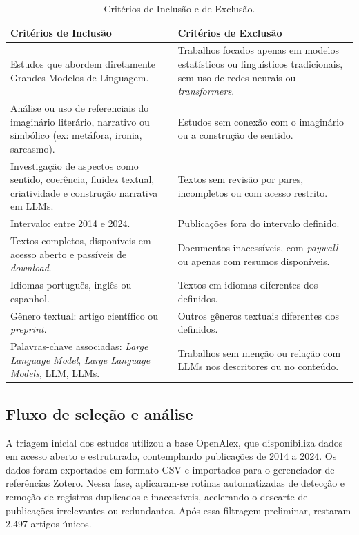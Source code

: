 \documentclass[portuguese]{textolivre}
\begin{document}
\begin{table}[h!]
\centering
\begin{threeparttable}
\caption{Critérios de Inclusão e de Exclusão.}\label{tab-2}
\small
\begin{tabularx}{\textwidth}{X X}
\toprule
Critérios de Inclusão & Critérios de Exclusão \\
\midrule
Estudos que abordem diretamente Grandes Modelos de Linguagem. & Trabalhos focados apenas em modelos estatísticos ou linguísticos tradicionais, sem uso de redes neurais ou \textit{transformers}. \\
\addlinespace
Análise ou uso de referenciais do imaginário literário, narrativo ou simbólico (ex: metáfora, ironia, sarcasmo). & Estudos sem conexão com o imaginário ou a construção de sentido. \\
\addlinespace
Investigação de aspectos como sentido, coerência, fluidez textual, criatividade e construção narrativa em LLMs. & Textos sem revisão por pares, incompletos ou com acesso restrito. \\
\addlinespace
Intervalo: entre 2014 e 2024. & Publicações fora do intervalo definido. \\
\addlinespace
Textos completos, disponíveis em acesso aberto e passíveis de \textit{download}. & Documentos inacessíveis, com \textit{paywall} ou apenas com resumos disponíveis. \\
\addlinespace
Idiomas português, inglês ou espanhol. & Textos em idiomas diferentes dos definidos. \\
\addlinespace
Gênero textual: artigo científico ou \textit{preprint}. & Outros gêneros textuais diferentes dos definidos. \\
\addlinespace
Palavras-chave associadas: \textit{Large Language Model}, \textit{Large Language Models}, LLM, LLMs. & Trabalhos sem menção ou relação com LLMs nos descritores ou no conteúdo. \\
\bottomrule
\end{tabularx}
\end{threeparttable}
\end{table}

\subsection{Fluxo de seleção e análise}

A triagem inicial dos estudos utilizou a base OpenAlex, que disponibiliza dados em acesso aberto e estruturado, contemplando publicações de 2014 a 2024. Os dados foram exportados em formato CSV e importados para o gerenciador de referências Zotero. Nessa fase, aplicaram-se rotinas automatizadas de detecção e remoção de registros duplicados e inacessíveis, acelerando o descarte de publicações irrelevantes ou redundantes. Após essa filtragem preliminar, restaram 2.497 artigos únicos.
\end{document}
